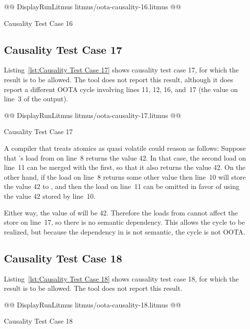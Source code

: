 \documentclass[10]{article}
\begin{document}
\begin{listing}[tbp]
@@ DisplayRunLitmus litmus/oota-causality-16.litmus @@
\caption{Causality Test Case 16}
\label{lst:Causality Test Case 16}
\end{listing}

\subsection{Causality Test Case 17}
\label{app:Causality Test Case 17}

Listing~\ref{lst:Causality Test Case 17}
shows causality test case 17, for which the 
result is to be allowed.
The  tool does not report this result, although it does
report a different OOTA cycle involving lines 11, 12, 16, and~17
(the  value on line~3 of the  output).

\begin{listing}[tbp]
@@ DisplayRunLitmus litmus/oota-causality-17.litmus @@
\caption{Causality Test Case 17}
\label{lst:Causality Test Case 17}
\end{listing}

A compiler that treats atomics as quasi volatile could reason as follows:
Suppose that 's load from  on line~8 returns the value 42.
In that case, the second load on line~11 can be merged with the first,
so that it also returns the value 42.
On the other hand, if the load on line~8 returns some other value then
line~10 will store the value 42 to , and then the load on line~11
can be omitted in favor of using the value 42 stored by line~10.

Either way, the value of  will be 42.
Therefore the loads from  cannot affect the store on line~17,
so there is no semantic dependency.
This allows the cycle to be realized,
but because the dependency in  is not semantic,
the cycle is not OOTA.

\subsection{Causality Test Case 18}
\label{app:Causality Test Case 18}

Listing~\ref{lst:Causality Test Case 18}
shows causality test case 18, for which the 
result is to be allowed.
The  tool does not report this result.

\begin{listing}[tbp]
@@ DisplayRunLitmus litmus/oota-causality-18.litmus @@
\caption{Causality Test Case 18}
\label{lst:Causality Test Case 18}
\end{listing}
\end{document}
